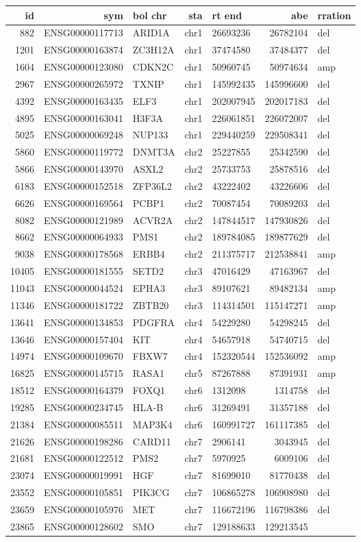 \documentclass[]{article}
\begin{document}
\begin{longtable}[]{@{}rrlrlrl@{}}
\toprule
id & sym & bol chr & sta & rt end & abe & rration\tabularnewline
\midrule
\endhead
882 & ENSG00000117713 & ARID1A & chr1 & 26693236 & 26782104 &
del\tabularnewline
1201 & ENSG00000163874 & ZC3H12A & chr1 & 37474580 & 37484377 &
del\tabularnewline
1604 & ENSG00000123080 & CDKN2C & chr1 & 50960745 & 50974634 &
amp\tabularnewline
2967 & ENSG00000265972 & TXNIP & chr1 & 145992435 & 145996600 &
del\tabularnewline
4392 & ENSG00000163435 & ELF3 & chr1 & 202007945 & 202017183 &
del\tabularnewline
4895 & ENSG00000163041 & H3F3A & chr1 & 226061851 & 226072007 &
del\tabularnewline
5025 & ENSG00000069248 & NUP133 & chr1 & 229440259 & 229508341 &
del\tabularnewline
5860 & ENSG00000119772 & DNMT3A & chr2 & 25227855 & 25342590 &
del\tabularnewline
5866 & ENSG00000143970 & ASXL2 & chr2 & 25733753 & 25878516 &
del\tabularnewline
6183 & ENSG00000152518 & ZFP36L2 & chr2 & 43222402 & 43226606 &
del\tabularnewline
6626 & ENSG00000169564 & PCBP1 & chr2 & 70087454 & 70089203 &
del\tabularnewline
8082 & ENSG00000121989 & ACVR2A & chr2 & 147844517 & 147930826 &
del\tabularnewline
8662 & ENSG00000064933 & PMS1 & chr2 & 189784085 & 189877629 &
del\tabularnewline
9038 & ENSG00000178568 & ERBB4 & chr2 & 211375717 & 212538841 &
amp\tabularnewline
10405 & ENSG00000181555 & SETD2 & chr3 & 47016429 & 47163967 &
del\tabularnewline
11043 & ENSG00000044524 & EPHA3 & chr3 & 89107621 & 89482134 &
amp\tabularnewline
11346 & ENSG00000181722 & ZBTB20 & chr3 & 114314501 & 115147271 &
amp\tabularnewline
13641 & ENSG00000134853 & PDGFRA & chr4 & 54229280 & 54298245 &
del\tabularnewline
13646 & ENSG00000157404 & KIT & chr4 & 54657918 & 54740715 &
del\tabularnewline
14974 & ENSG00000109670 & FBXW7 & chr4 & 152320544 & 152536092 &
amp\tabularnewline
16825 & ENSG00000145715 & RASA1 & chr5 & 87267888 & 87391931 &
amp\tabularnewline
18512 & ENSG00000164379 & FOXQ1 & chr6 & 1312098 & 1314758 &
del\tabularnewline
19285 & ENSG00000234745 & HLA-B & chr6 & 31269491 & 31357188 &
del\tabularnewline
21384 & ENSG00000085511 & MAP3K4 & chr6 & 160991727 & 161117385 &
del\tabularnewline
21626 & ENSG00000198286 & CARD11 & chr7 & 2906141 & 3043945 &
del\tabularnewline
21681 & ENSG00000122512 & PMS2 & chr7 & 5970925 & 6009106 &
del\tabularnewline
23074 & ENSG00000019991 & HGF & chr7 & 81699010 & 81770438 &
del\tabularnewline
23552 & ENSG00000105851 & PIK3CG & chr7 & 106865278 & 106908980 &
del\tabularnewline
23659 & ENSG00000105976 & MET & chr7 & 116672196 & 116798386 &
del\tabularnewline
23865 & ENSG00000128602 & SMO & chr7 & 129188633 & 129213545 &

\end{longtable}
\end{document}
